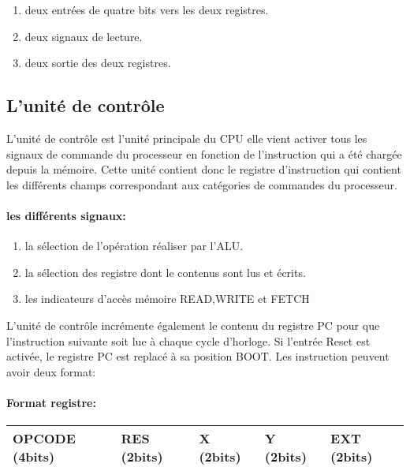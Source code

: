 \begin{enumerate}
\item deux entrées de quatre bits vers les deux registres.
\item deux signaux de lecture.
\item deux sortie des deux registres.
\end{enumerate}


\subsection{L'unité de contrôle}
\label{sec:re-unité contrôle}

L'unité de contrôle est l'unité principale du CPU elle vient activer tous les signaux de commande du processeur en fonction 
de l’instruction qui a été chargée depuis la mémoire.  Cette unité contient donc le registre d’instruction qui contient  les  différents champs correspondant aux catégories de commandes du processeur.

\paragraph{les différents signaux:}
\begin{enumerate}
\item la sélection de l’opération réaliser par l'ALU.
\item la sélection des registre dont le contenus sont lus et écrits.
\item les indicateurs d'accès mémoire READ,WRITE et FETCH
\end{enumerate}

L'unité de contrôle incrémente également le contenu du registre PC pour que l'instruction suivante soit lue à chaque cycle d'horloge. Si l'entrée Reset est activée, le registre PC est replacé à sa position BOOT. Les instruction peuvent avoir deux format:  

\paragraph{Format registre:}

\begin{center}
\begin{tabular} {|p{3cm}|p{2cm}|p{1.5cm}|p{1.5cm}|p{2.1cm}|}
\hline
OPCODE (4bits) & RES (2bits) & X (2bits) & Y (2bits) & EXT (2bits) \\
\hline
\end{tabular}
\end{center}

